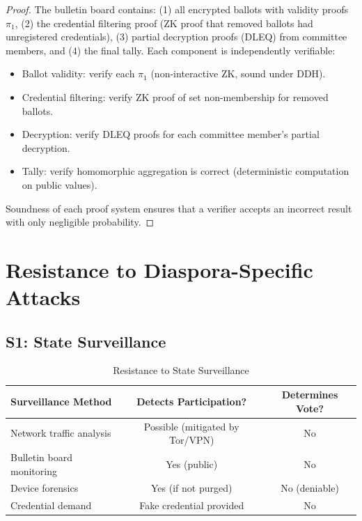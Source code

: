 \documentclass[11pt,a4paper]{article}
\begin{document}
\begin{proof}
The bulletin board contains: (1) all encrypted ballots with validity proofs $\pi_1$, (2) the credential filtering proof (ZK proof that removed ballots had unregistered credentials), (3) partial decryption proofs (DLEQ) from committee members, and (4) the final tally. Each component is independently verifiable:

\begin{itemize}
    \item Ballot validity: verify each $\pi_1$ (non-interactive ZK, sound under DDH).
    \item Credential filtering: verify ZK proof of set non-membership for removed ballots.
    \item Decryption: verify DLEQ proofs for each committee member's partial decryption.
    \item Tally: verify homomorphic aggregation is correct (deterministic computation on public values).
\end{itemize}

Soundness of each proof system ensures that a verifier accepts an incorrect result with only negligible probability.
\end{proof}

\section{Resistance to Diaspora-Specific Attacks}

\subsection{S1: State Surveillance}

\begin{table}[H]
\centering
\caption{Resistance to State Surveillance}
\label{tab:s1}
\begin{tabular}{lcc}
\toprule
\textbf{Surveillance Method} & \textbf{Detects Participation?} & \textbf{Determines Vote?} \\
\midrule
Network traffic analysis & Possible (mitigated by Tor/VPN) & No \\
Bulletin board monitoring & Yes (public) & No \\
Device forensics & Yes (if not purged) & No (deniable) \\
Credential demand & Fake credential provided & No \\
\bottomrule
\end{tabular}
\end{table}
\end{document}
